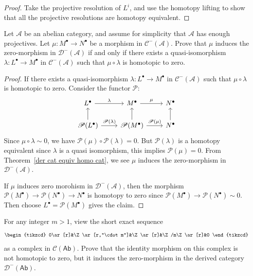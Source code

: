 \begin{proof}
Take the projective resolution of $L^i$, and use the homotopy lifting to show that all the projective resolutions are homotopy equivalent.
\end{proof}
\begin{exercise}\label{induce zero der cat}
Let $\mathcal{A}$ be an abelian category, and assume for simplicity that $\mathcal{A}$ has enough
projectives. Let $\mu:M^\bullet\to N^\bullet$ be a morphism in $\mathcal{C}^-(\mathcal{A})$. Prove that $\mu$ induces the zero-morphism in $\mathcal{D}^-(\mathcal{A})$ if and only if there exists a quasi-isomorphism $\lambda:L^\bullet\to M^\bullet$ in $\mathcal{C}^-(\mathcal{A})$ such that $\mu\circ\lambda$ is homotopic to zero.
\end{exercise}
\begin{proof}
If there exists a quasi-isomorphism $\lambda:L^\bullet\to M^\bullet$ in $\mathcal{C}^-(\mathcal{A})$ such that $\mu\circ\lambda$ is homotopic to zero. Consider the functor $\mathscr{P}$:
\[\begin{tikzcd}
L^\bullet\ar[r,"\lambda"]&M^\bullet\ar[r,"\mu"]&N^\bullet\\
\mathscr{P}(L^\bullet)\ar[u]\ar[r,"\mathscr{P}(\lambda)"]&\mathscr{P}(M^\bullet)\ar[u]\ar[r,"\mathscr{P}(\mu)"]&N^\bullet\ar[u]
\end{tikzcd}\]
Since $\mu\circ\lambda\sim 0$, we have $\mathscr{P}(\mu)\circ\mathscr{P}(\lambda)=0$. But $\mathscr{P}(\lambda)$ is a homotopy equivalent since $\lambda$ is a quasi isomorphism, this implies $\mathscr{P}(\mu)=0$. From Theorem~\ref{der cat equiv homo cat}, we see $\mu$ induces the zero-morphism in $\mathcal{D}^-(\mathcal{A})$.\par
If $\mu$ induces zero morohism in $\mathcal{D}^-(\mathcal{A})$, then the morphism $\mathscr{P}(M^\bullet)\to\mathscr{P}(N^\bullet)\to N^\bullet$ is homotopy to zero since $\mathscr{P}(M^\bullet)\to\mathscr{P}(N^\bullet)\sim 0$. Then choose $L^\bullet=\mathscr{P}(M^\bullet)$ gives the claim.
\end{proof}
\begin{exercise}
For any integer $m>1$, view the short exact sequence
\[\begin{tikzcd}
0\ar[r]&\Z\ar[r,"\cdot m"]&\Z\ar[r]&\Z/m\Z\ar[r]&0
\end{tikzcd}\]
as a complex in $\mathcal{C}(\mathsf{Ab})$. Prove that the identity morphism on this complex is not homotopic to zero, but it induces the zero-morphism in the derived category $\mathcal{D}^-(\mathsf{Ab})$.
\end{exercise}
